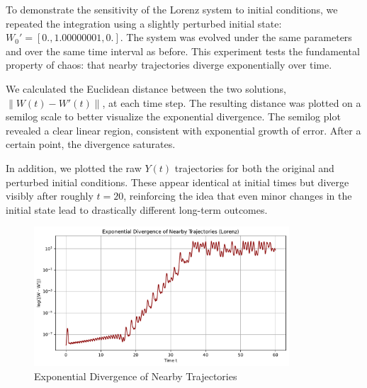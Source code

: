 \documentclass[11pt]{article}
\begin{document}
To demonstrate the sensitivity of the Lorenz system to initial conditions, we repeated the integration using a slightly perturbed initial state: $W_0' = [0., 1.00000001, 0.]$. The system was evolved under the same parameters and over the same time interval as before. This experiment tests the fundamental property of chaos: that nearby trajectories diverge exponentially over time.

We calculated the Euclidean distance between the two solutions, $\| W(t) - W'(t) \|$, at each time step. The resulting distance was plotted on a semilog scale to better visualize the exponential divergence. The semilog plot revealed a clear linear region, consistent with exponential growth of error. After a certain point, the divergence saturates.

In addition, we plotted the raw $Y(t)$ trajectories for both the original and perturbed initial conditions. These appear identical at initial times but diverge visibly after roughly $t = 20$, reinforcing the idea that even minor changes in the initial state lead to drastically different long-term outcomes.

\begin{figure}[H]
    \centering
    \includegraphics[width=0.85\textwidth]{fig2e.pdf}
    \caption{Exponential Divergence of Nearby Trajectories }
\end{figure}
\end{document}

